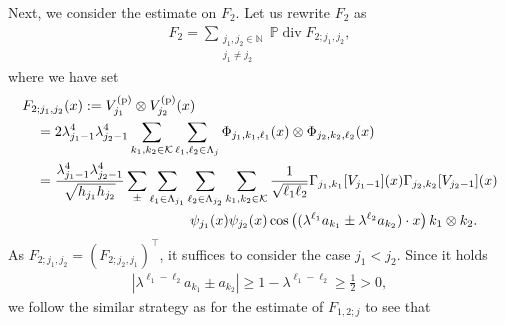 \documentclass[a4paper,12pt,reqno]{amsart}
\theoremstyle{plain}
\theoremstyle{definition}
\renewcommand{\div}{\operatorname{div}}
\renewcommand{\geq}{\geqslant}
\newcommand{\N}{\mathbb{N}}
\renewcommand{\sp}[1]{\left(#1\right)}
\begin{document}
Next, we consider the estimate on $F_2$.
Let us rewrite $F_2$ as 
\begin{align}
    F_2
    =
    \sum_{\substack{j_1,j_2 \in \N \\ j_1 \neq j_2}}
    \mathbb{P}\div F_{2;j_1,j_2},
\end{align}
where we have set
\begin{align}
    &
    F_{2;j_1,j_2}(x)
    :={}
    V^{({\rm p})}_{j_1} \otimes V^{({\rm p})}_{j_2}(x)
    \\
    &\quad
    =
    2\lambda_{j_1-1}^4\lambda_{j_2-1}^4
    \sum_{k_1, k_2 \in \mathcal{K}}
    \sum_{\ell_1,\ell_2 \in \Lambda_j}
    \Phi_{j_1,k_1,\ell_1}(x)
    \otimes
    \Phi_{j_2,k_2,\ell_2}(x)
    \\
    &\quad
    =
    \frac{\lambda_{j_1-1}^4\lambda_{j_2-1}^4}{\sqrt{h_{j_1}h_{j_2}}}
    \sum_{\pm}
    \sum_{\ell_1 \in \Lambda_{j_1}}
    \sum_{\ell_2 \in \Lambda_{j_2}}
    \sum_{k_1, k_2 \in \mathcal{K}}
    \frac{1}{\sqrt{\ell_1\ell_2}}
    \Gamma_{j_1,k_1}[V_{j_1-1}](x)
    \Gamma_{j_2,k_2}[V_{j_2-1}](x)
    \\
    & 
    \qquad \qquad \qquad \qquad \qquad \qquad 
    \psi_{j_1}(x)\psi_{j_2}(x)
    \cos\sp{(\lambda^{\ell_1}a_{k_1}\pm\lambda^{\ell_2}a_{k_2})\cdot x}k_1 \otimes k_2.
\end{align}
As $F_{2;j_1,j_2} = (F_{2;j_2,j_1})^{\top}$, it suffices to consider the case $j_1<j_2$.
Since it holds
\begin{align}
    |\lambda^{\ell_1-\ell_2}a_{k_1}\pm a_{k_2}|
    \geq 
    1 - \lambda^{\ell_1-\ell_2} 
    \geq 
    \frac{1}{2}
    >0,
\end{align}
we follow the similar strategy as for the estimate of $F_{1,2;j}$ to see that
\end{document}
